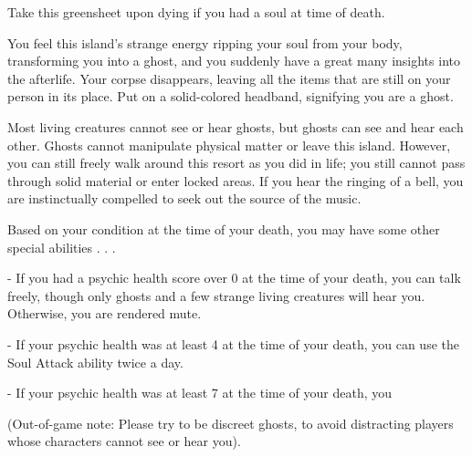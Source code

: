 \documentclass[green]{Kos}
\begin{document}
\name{\gGhost{}}

Take this greensheet upon dying if you had a soul at time of death.

You feel this island's strange energy ripping your soul from your body, transforming you into a ghost, and you suddenly have a great many insights into the afterlife. Your corpse disappears, leaving all the items that are still on your person in its place. Put on a solid-colored headband, signifying you are a ghost.

Most living creatures cannot see or hear ghosts, but ghosts can see and hear each other. Ghosts cannot manipulate physical matter or leave this island. However, you can still freely walk around this resort as you did in life; you still cannot pass through solid material or enter locked areas. If you hear the ringing of a bell, you are instinctually compelled to seek out the source of the music. 

Based on your condition at the time of your death, you may have some other special abilities . . . 

- If you had a psychic health score over 0 at the time of your death, you can talk freely, though only ghosts and a few strange living creatures will hear you. Otherwise, you are rendered mute.

- If your psychic health was at least 4 at the time of your death, you can use the Soul Attack ability twice a day. 

- If your psychic health was at least 7 at the time of your death, you 

(Out-of-game note: Please try to be discreet ghosts, to avoid distracting players whose characters cannot see or hear you).
\end{document}
